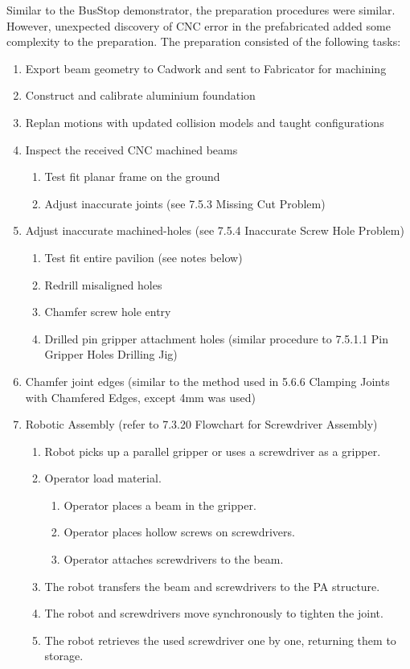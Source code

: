 Similar to the BusStop demonstrator, the preparation procedures were similar. However, unexpected discovery of CNC error in the prefabricated added some complexity to the preparation. The preparation consisted of the following tasks:
\begin{enumerate}
    \item Export beam geometry to Cadwork and sent to Fabricator for machining
    \item Construct and calibrate aluminium foundation
    \item Replan motions with updated collision models and taught configurations
    \item Inspect the received CNC machined beams
    \begin{enumerate}
        \item Test fit planar frame on the ground
        \item Adjust inaccurate joints  (see 7.5.3 Missing Cut Problem)
    \end{enumerate}
    \item Adjust inaccurate machined-holes (see 7.5.4 Inaccurate Screw Hole Problem)
    \begin{enumerate}
        \item Test fit entire pavilion (see notes below)
        \item Redrill misaligned holes
        \item Chamfer screw hole entry
        \item Drilled pin gripper attachment holes (similar procedure to 7.5.1.1 Pin Gripper Holes Drilling Jig)
    \end{enumerate}
    \item Chamfer joint edges (similar to the method used in 5.6.6 Clamping Joints with Chamfered Edges, except 4mm was used)
    \item Robotic Assembly (refer to 7.3.20 Flowchart for Screwdriver Assembly)
    \begin{enumerate}
        \item Robot picks up a parallel gripper or uses a screwdriver as a gripper.
        \item Operator load material.
        \begin{enumerate}
            \item Operator places a beam in the gripper.
            \item Operator places hollow screws on screwdrivers.
            \item Operator attaches screwdrivers to the beam.
        \end{enumerate}
        \item The robot transfers the beam and screwdrivers to the PA structure.
        \item The robot and screwdrivers move synchronously to tighten the joint.
        \item The robot retrieves the used screwdriver one by one, returning them to storage.
    \end{enumerate}
\end{enumerate}

